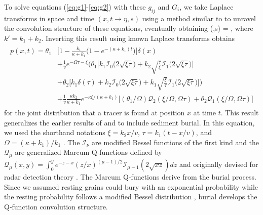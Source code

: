To solve equations (\ref{eq:g1}-\ref{eq:g2}) with these $g_{ij}$ and $G_i$, we take Laplace transforms in space and time $(x,t \rightarrow 
\eta,s) $ using a method similar to \citet{Weeks1998} to unravel the convolution structure of these equations, eventually obtaining
\be {}(\eta,s) = , \label{eq:nicedist}\ee
where $k' = k_1 + k_2$. Inverting this result using known Laplace transforms \citep{Prudnikov1986,Arfken1985} obtains
\begin{align}
	\begin{split}
		p(x,t) = \theta_1&\Big[1-\frac{k_1}{\kappa+k_1}\Big(1-e^{-(\kappa+k_1)t}\Big)\Big]\delta(x) \\ &+ \frac{1}{v}e^{-\Omega \tau - \xi}\Big(\theta_1\Big[k_1\mathcal{I}_0\big(2\sqrt{\xi\tau}\big) + k_2\sqrt{\frac{\tau}{\xi}}\mathcal{I}_1\big(2\sqrt{\xi\tau}\big)\Big] \\ 
		&+ \theta_2\Big[k_1\delta(\tau) + k_2 \mathcal{I}_0\big(2\sqrt{\xi\tau}\big)+k_1 \sqrt{\frac{\xi}{\tau}}\mathcal{I}_1\big(2\sqrt{\xi\tau}\big)\Big]\Big) \\
		&+ \frac{1}{v}\frac{\kappa k_2}{\kappa + k_1}e^{-\kappa \xi/(\kappa + k_1)}\Big[(\theta_1/\Omega)\mathcal{Q}_2(\xi/\Omega,\Omega\tau) + \theta_2 \mathcal{Q}_1(\xi/\Omega,\Omega\tau)\Big]
		\label{eq:pdf}
	\end{split}
\end{align}
for the joint distribution that a tracer is found at position $x$ at time $t$.
This result generalizes the earlier results of \citet{Lisle1998} and \citet{Einstein1937} to include sediment burial.
In this equation, we used the shorthand notations $\xi = k_2 x/v$, $\tau = k_1(t-x/v)$, and $\Omega = (\kappa+k_1)/k_1$ \citep{Lisle1998}. The $\mathcal{I}_\nu$ are modified Bessel functions of the first kind and the $\mathcal{Q}_\mu$ are generalized Marcum Q-functions defined by $\mathcal{Q}_\mu(x,y) = \int_0^y e^{-z-x}(z/x)^{(\mu-1)/2}\mathcal{I}_{\mu-1}(2\sqrt{xz})dz $ and originally devised for radar detection theory \citep{Marcum1960,Temme1996}. 
The Marcum Q-functions derive from the burial process.
Since we assumed resting grains could bury with an exponential probability while the resting probability follows a modified Bessel distribution \citep{Einstein1937,Lisle1998}, burial develops the Q-function convolution structure. 


